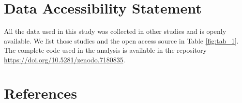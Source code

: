 \documentclass{article}
\begin{document}
\hypertarget{data-accessibility-statement}{%
\section{Data Accessibility
Statement}\label{data-accessibility-statement}}

All the data used in this study was collected in other studies and is
openly available. We list those studies and the open access source in
Table \ref{fig:tab_1}. The complete code used in the analysis is
available in the repository
\url{https://doi.org/10.5281/zenodo.7180835}.

\hypertarget{references}{%
\section*{References}\label{references}}
\end{document}
